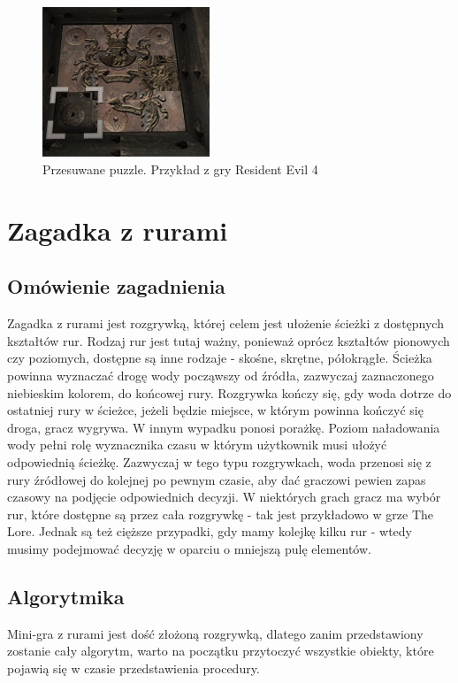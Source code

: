 \documentclass[oneside,polski,logo]{amuthesis}
\begin{document}
\begin{figure}[h]
	\centering
	\includegraphics[width=5cm]{images/tyrek/re4.png}
	\caption{Przesuwane puzzle. Przykład z gry Resident Evil 4}
\end{figure}


\section{Zagadka z rurami}
\subsection{Omówienie zagadnienia}
Zagadka z rurami jest rozgrywką, której celem jest ułożenie ścieżki z dostępnych kształtów rur. Rodzaj rur jest tutaj ważny, ponieważ oprócz kształtów pionowych czy poziomych, dostępne są inne rodzaje - skośne, skrętne, półokrągłe.
Ścieżka powinna wyznaczać drogę wody począwszy od źródła, zazwyczaj zaznaczonego niebieskim kolorem, do końcowej rury. Rozgrywka kończy się, gdy woda dotrze do ostatniej rury w ścieżce, jeżeli będzie miejsce, w którym powinna kończyć się droga, gracz wygrywa. W innym wypadku ponosi porażkę.
Poziom naładowania wody pełni rolę wyznacznika czasu w którym użytkownik musi ułożyć odpowiednią ścieżkę. Zazwyczaj w tego typu rozgrywkach, woda przenosi się z rury źródłowej do kolejnej po pewnym czasie, aby dać graczowi pewien zapas czasowy na podjęcie odpowiednich decyzji. W niektórych grach gracz ma wybór rur, które dostępne są przez cała rozgrywkę - tak jest przykładowo w grze The Lore. Jednak są też cięższe przypadki, gdy mamy kolejkę kilku rur - wtedy musimy podejmować decyzję w oparciu o mniejszą pulę elementów.
\subsection{Algorytmika}
Mini-gra z rurami jest dość złożoną rozgrywką, dlatego zanim przedstawiony zostanie cały algorytm, warto na początku przytoczyć wszystkie obiekty, które pojawią się w czasie przedstawienia procedury.
\end{document}
